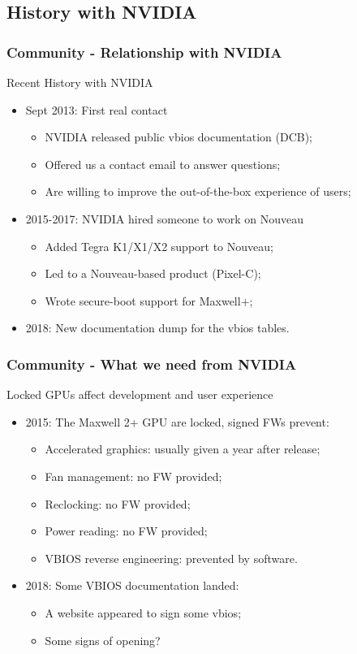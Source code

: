 \documentclass[11pt,english,compress]{beamer}
\begin{document}
\subsection{History with NVIDIA}
\begin{frame}
	\frametitle{Community - Relationship with NVIDIA}

	\begin{block}{Recent History with NVIDIA}
		\begin{itemize}
			\item Sept 2013: First real contact
			\begin{itemize}
				\item NVIDIA released public vbios documentation (DCB);
				\item Offered us a contact email to answer questions;
				\item Are willing to improve the out-of-the-box
experience of users;
			\end{itemize}
			\item 2015-2017: NVIDIA hired someone to work on Nouveau
			\begin{itemize}
				\item Added Tegra K1/X1/X2 support to Nouveau;
				\item Led to a Nouveau-based product (Pixel-C);
				\item Wrote secure-boot support for Maxwell+;
			\end{itemize}
			\item 2018: New documentation dump for the vbios tables.
		\end{itemize}
	\end{block}
\end{frame}

\begin{frame}
	\frametitle{Community - What we need from NVIDIA}

	\begin{block}{Locked GPUs affect development and user experience}
		\begin{itemize}
			\item 2015: The Maxwell 2+ GPU are locked, signed FWs prevent:
			\begin{itemize}
				\item Accelerated graphics: usually given a year after release;
				\item Fan management: no FW provided;
				\item Reclocking: no FW provided;
				\item Power reading: no FW provided;
				\item VBIOS reverse engineering: prevented by software.
			\end{itemize}
			\item 2018: Some VBIOS documentation landed:
			\begin{itemize}
				\item A website appeared to sign some vbios;
				\item Some signs of opening?
			\end{itemize}
		\end{itemize}
	\end{block}
\end{frame}
\end{document}
